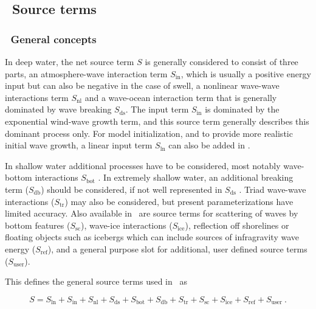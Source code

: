 \vssub
\subsection{~Source terms}
\vsssub
\subsubsection{~General concepts}
\vsssub

In deep water, the net source term $S$ is generally considered to consist of
three parts, an atmosphere-wave interaction term $S_{\mathrm{in}}$, which 
is usually a positive energy input but can also be negative in the case of swell, a nonlinear wave-wave
interactions term $S_{\mathrm{nl}}$ and a wave-ocean interaction term that is generally dominated by wave breaking
$S_{\mathrm{ds}}$. The input term $S_{\mathrm{in}}$ is dominated by the
exponential wind-wave growth term, and this source term generally describes this
dominant process only. For model initialization, and to provide more realistic
initial wave growth, a linear input term $S_{\mathrm{ln}}$ can also be added in
\ws.

In shallow water additional processes have to be considered, most notably
wave-bottom interactions $S_{\mathrm{bot}}$ \cite[e.g.,][]{pro:Sea78}. In extremely
shallow water, an additional  breaking term ($S_{\mathrm{db}}$) should be considered,  
if not well represented in  $S_{\mathrm{ds}}$ \citep[see][]{Filipot&Ardhuin2012}.
Triad wave-wave
interactions ($S_{\mathrm{tr}}$) may also be considered, but present parameterizations have limited accuracy. 
Also available in \ws\ are source
terms for scattering of waves by bottom features ($S_{\mathrm{sc}}$), wave-ice
interactions ($S_{\mathrm{ice}}$), reflection off shorelines or floating objects such
as icebergs which can include sources of infragravity wave energy ($S_{\mathrm{ref}}$),  and a general purpose slot for additional, user
defined source terms ($S_{\mathrm{user}}$).

This defines the general source terms used in \ws\ as


\begin{equation}
S = S_{\mathrm{ln}} + S_{\mathrm{in}} + S_{\mathrm{nl}} + S_{\mathrm{ds}} + S_{\mathrm{bot}} + S_{\mathrm{db}} 
    + S_{\mathrm{tr}} +
    S_{\mathrm{sc}} + S_{\mathrm{ice}} + S_{\mathrm{ref}} + S_{\mathrm{user}}\: .
\label{eq:general_st}
\end{equation}

